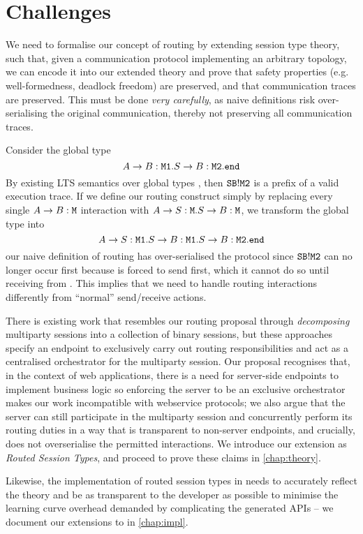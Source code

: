 \section{Challenges}
\label{section:routerchallenges}

We need to formalise our concept of routing by extending session
type theory, such that, given a communication protocol implementing 
an arbitrary topology, we can encode it into our extended theory and
prove that safety properties (e.g. well-formedness, deadlock freedom)
are preserved, and that communication traces are preserved.
This must be done \textit{very carefully}, as
naive definitions risk over-serialising the original communication,
thereby not preserving all communication traces.

\begin{example}
Consider the global type
\[
A \to B: \texttt{M1}. S \to B: \texttt{M2}. \texttt{end}
\]
By existing LTS semantics over
global types \cite{characterisation}, 
then ${\mathtt{S}}{\mathtt{B}}!{\texttt{M2}}$
is a prefix of a valid execution trace.
If we define our routing construct simply by replacing every single
$A \to B: \texttt{M}$ interaction with $A \to S: \texttt{M}.
S \to B: \texttt{M}$, we transform the global type into
\[
A \to S: \texttt{M1}. S \to B: \texttt{M1}. S \to B: \texttt{M2}. \texttt{end}
\]
our naive definition of routing has over-serialised the protocol
since ${\mathtt{S}}{\mathtt{B}}!{\texttt{M2}}$ can no longer occur first because 
is forced to send  first, which it cannot do so until receiving
from .
This implies that we need to handle routing interactions differently
from ``normal'' send/receive actions.
\end{example}

There is existing work \cite{LinearDecomp, BinaryDecomp, BinaryDuality}
that resembles our routing proposal through
\textit{decomposing} multiparty sessions into a collection
of binary sessions,
but these approaches
specify an endpoint to exclusively carry out
routing responsibilities and act as a centralised orchestrator 
for the multiparty session.
Our proposal recognises that, in the context of web applications,
there is a need for server-side endpoints to implement business logic
so enforcing the server to be an exclusive orchestrator makes our work
incompatible with webservice protocols; 
we also argue that the server can still participate in the 
multiparty session and concurrently perform its routing duties
in a way that is transparent to non-server endpoints, and crucially,
does not overserialise the permitted interactions. 
We introduce our extension as \textit{Routed Session Types},
and proceed to prove these claims in \cref{chap:theory}.

Likewise, the implementation of routed session types 
in  needs to accurately reflect the theory
and be as transparent to the developer as possible to minimise
the learning curve overhead demanded 
by complicating the generated APIs -- we document our extensions
to  in \cref{chap:impl}.